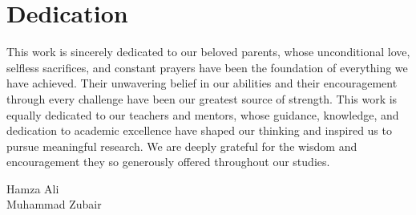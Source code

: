 \chapter*{Dedication}
This work is sincerely dedicated to our beloved parents, whose unconditional love, selfless sacrifices, and constant prayers have been the foundation of everything we have achieved. Their unwavering belief in our abilities and their encouragement through every challenge have been our greatest source of strength. This work is equally dedicated to our teachers and mentors, whose guidance, knowledge, and dedication to academic excellence have shaped our thinking and inspired us to pursue meaningful research. We are deeply grateful for the wisdom and encouragement they so generously offered throughout our studies.
\begin{flushright}
Hamza Ali\\
Muhammad Zubair
\end{flushright}